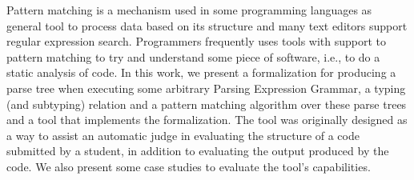 \begin{foreignabstract}

Pattern matching is a mechanism used in some programming languages as general 
tool to process data based on its structure and many text editors support regular 
expression search. Programmers frequently uses tools with support to pattern 
matching to try and understand some piece of software, i.e., to do a static analysis 
of code. In this work, we present a formalization for producing a parse tree 
when executing some arbitrary Parsing Expression Grammar, a typing (and subtyping) 
relation and a pattern matching algorithm over these parse trees and a tool that 
implements the formalization. The tool was originally designed as a way to assist 
an automatic judge in evaluating the structure of a code submitted by a student, 
in addition to evaluating the output produced by the code. We also present some 
case studies to evaluate the tool's capabilities.

\end{foreignabstract}